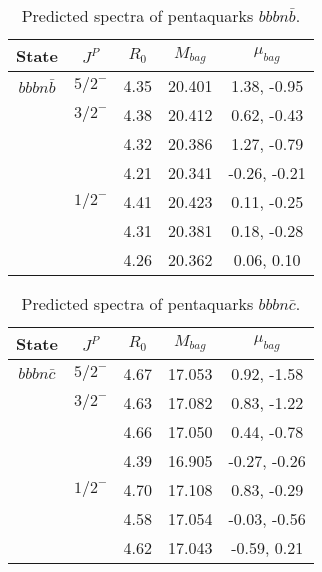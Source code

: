\documentclass[prd,twocolumn,floatfix,nofootinbib]{revtex4}
\begin{document}
\renewcommand{\tabcolsep}{0.5cm}
\renewcommand{\arraystretch}{1.2}
\begin{table*}[!htbp]
    \caption{Predicted spectra of pentaquarks $bbbn\bar{b}$.}
    \begin{tabular}{ccccc}
        \hline\hline
        {\rm State} &$J^{P}$ &$R_{0}$ &$M_{bag}$ &$\mu_{bag}$ \\ \hline
        ${bbbn\bar{b}}$
            &${5/2}^{-}$    &4.35   &20.401 &1.38, -0.95 \\
            &${3/2}^{-}$    &4.38   &20.412 &0.62, -0.43 \\
            &               &4.32   &20.386 &1.27, -0.79 \\
            &               &4.21   &20.341 &-0.26, -0.21 \\
            &${1/2}^{-}$    &4.41   &20.423 &0.11, -0.25 \\
            &               &4.31   &20.381 &0.18, -0.28 \\
            &               &4.26   &20.362 &0.06, 0.10 \\
        \hline\hline 
    \end{tabular}
\end{table*}

\renewcommand{\tabcolsep}{0.5cm}
\renewcommand{\arraystretch}{1.2}
\begin{table*}[!htbp]
    \caption{Predicted spectra of pentaquarks $bbbn\bar{c}$.}
    \begin{tabular}{ccccc}
        \hline\hline
        {\rm State} &$J^{P}$ &$R_{0}$ &$M_{bag}$ &$\mu_{bag}$ \\ \hline
        ${bbbn\bar{c}}$
            &${5/2}^{-}$    &4.67   &17.053 &0.92, -1.58 \\
            &${3/2}^{-}$    &4.63   &17.082 &0.83, -1.22 \\
            &               &4.66   &17.050 &0.44, -0.78 \\
            &               &4.39   &16.905 &-0.27, -0.26 \\
            &${1/2}^{-}$    &4.70   &17.108 &0.83, -0.29 \\
            &               &4.58   &17.054 &-0.03, -0.56 \\
            &               &4.62   &17.043  &-0.59, 0.21 \\
        \hline\hline 
    \end{tabular}
\end{table*}
\end{document}
